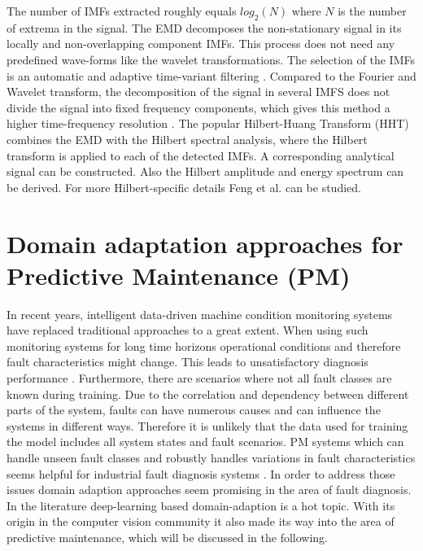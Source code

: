 The number of IMFs extracted roughly equals $log_{2}(N)$ where $N$ is the number of extrema in the signal. The EMD decomposes the non-stationary signal in its locally and non-overlapping component IMFs. This process does not need any predefined wave-forms like the wavelet transformations. The selection of the IMFs is an automatic and adaptive time-variant filtering \cite{Faltermeier2010}. Compared to the Fourier and Wavelet transform, the decomposition of the signal in several IMFS does not divide the signal into fixed frequency components, which gives this method a higher time-frequency resolution \cite{Verstraete2017}. The popular Hilbert-Huang Transform (HHT) combines the EMD with the Hilbert spectral analysis, where the Hilbert transform is applied to each of the detected IMFs. A corresponding analytical signal can be constructed. Also the Hilbert amplitude and energy spectrum can be derived. For more Hilbert-specific details Feng et al. \cite{FENG2013} can be studied.

\section{Domain adaptation approaches for Predictive Maintenance (PM)}
In recent years, intelligent data-driven machine condition monitoring systems have replaced traditional approaches to a great extent. When using such monitoring systems for long time horizons operational conditions and therefore fault characteristics might change. This leads to unsatisfactory diagnosis performance \cite{AZAMFAR2020103932}. Furthermore, there are scenarios where not all fault classes are known during training. Due to the correlation and dependency between different parts of the system, faults can have numerous causes and can influence the systems in different ways. Therefore it is unlikely that the data used for training the model includes all system states and fault scenarios. PM systems which can handle unseen fault classes and robustly handles variations in fault characteristics seems helpful for industrial fault diagnosis systems \cite{Michau2017}. In order to address those issues domain adaption approaches seem promising in the area of fault diagnosis. In the literature deep-learning based domain-adaption is a hot topic. With its origin in the computer vision community it also made its way into the area of predictive maintenance, which will be discussed in the following. 

